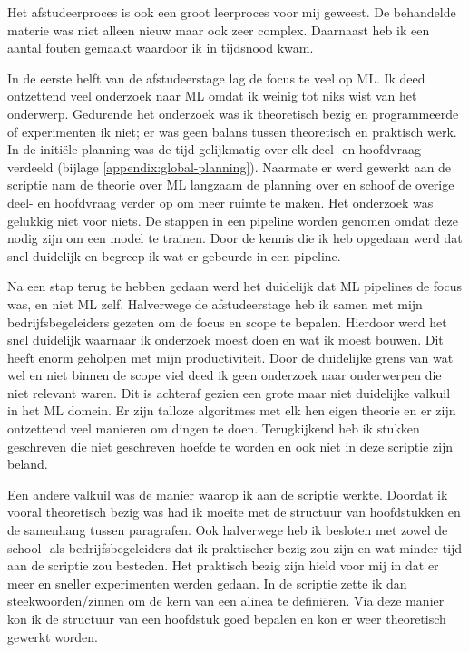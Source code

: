 Het afstudeerproces is ook een groot leerproces voor mij geweest. De behandelde materie was niet alleen nieuw maar ook zeer complex. Daarnaast heb ik een aantal fouten gemaakt waardoor ik in tijdsnood kwam.

In de eerste helft van de afstudeerstage lag de focus te veel op ML. Ik deed ontzettend veel onderzoek naar ML omdat ik weinig tot niks wist van het onderwerp. Gedurende het onderzoek was ik theoretisch bezig en programmeerde of experimenten ik niet; er was geen balans tussen theoretisch en praktisch werk. In de initiële planning was de tijd gelijkmatig over elk deel- en hoofdvraag verdeeld (bijlage \ref{appendix:global-planning}). Naarmate er werd gewerkt aan de scriptie nam de theorie over ML langzaam de planning over en schoof de overige deel- en hoofdvraag verder op om meer ruimte te maken. Het onderzoek was gelukkig niet voor niets. De stappen in een pipeline worden genomen omdat deze nodig zijn om een model te trainen. Door de kennis die ik heb opgedaan werd dat snel duidelijk en begreep ik wat er gebeurde in een pipeline.

Na een stap terug te hebben gedaan werd het duidelijk dat ML pipelines de focus was, en niet ML zelf. Halverwege de afstudeerstage heb ik samen met mijn bedrijfsbegeleiders gezeten om de focus en scope te bepalen. Hierdoor werd het snel duidelijk waarnaar ik onderzoek moest doen en wat ik moest bouwen. Dit heeft enorm geholpen met mijn productiviteit. Door de duidelijke grens van wat wel en niet binnen de scope viel deed ik geen onderzoek naar onderwerpen die niet relevant waren. Dit is achteraf gezien een grote maar niet duidelijke valkuil in het ML domein. Er zijn talloze algoritmes met elk hen eigen theorie en er zijn ontzettend veel manieren om dingen te doen. Terugkijkend heb ik stukken geschreven die niet geschreven hoefde te worden en ook niet in deze scriptie zijn beland.

Een andere valkuil was de manier waarop ik aan de scriptie werkte. Doordat ik vooral theoretisch bezig was had ik moeite met de structuur van hoofdstukken en de samenhang tussen paragrafen. Ook halverwege heb ik besloten met zowel de school- als bedrijfsbegeleiders dat ik praktischer bezig zou zijn en wat minder tijd aan de scriptie zou besteden. Het praktisch bezig zijn hield voor mij in dat er meer en sneller experimenten werden gedaan. In de scriptie zette ik dan steekwoorden/zinnen om de kern van een alinea te definiëren. Via deze manier kon ik de structuur van een hoofdstuk goed bepalen en kon er weer theoretisch gewerkt worden.

